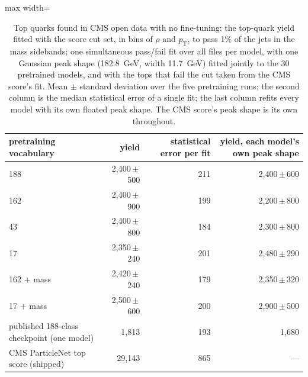 \begin{table}[t]
\centering
\small
\setlength{\tabcolsep}{4pt}
\caption{Top quarks found in CMS open data with no fine-tuning: the top-quark yield fitted with the score cut set, in bins of $\rho$ and $p_{\mathrm T}$, to pass 1\% of the jets in the mass sidebands; one simultaneous pass/fail fit over all files per model, with one Gaussian peak shape (182.8~GeV, width 11.7~GeV) fitted jointly to the 30 pretrained models, and with the tops that fail the cut taken from the CMS score's fit. Mean $\pm$ standard deviation over the five pretraining runs; the second column is the median statistical error of a single fit; the last column refits every model with its own floated peak shape. The CMS score's peak shape is its own throughout.}
\label{tab:realdata}
\begin{adjustbox}{max width=\linewidth}
\begin{tabular}{l r r r}
\toprule
pretraining vocabulary & yield & statistical error per fit & yield, each model's own peak shape \\
\midrule
188 & 2{,}400\,$\pm$\,500 & 211 & 2{,}400\,$\pm$\,600 \\
162 & 2{,}400\,$\pm$\,900 & 199 & 2{,}200\,$\pm$\,800 \\
43 & 2{,}400\,$\pm$\,800 & 184 & 2{,}300\,$\pm$\,800 \\
17 & 2{,}350\,$\pm$\,240 & 201 & 2{,}480\,$\pm$\,290 \\
162 + mass & 2{,}420\,$\pm$\,240 & 179 & 2{,}350\,$\pm$\,320 \\
17 + mass & 2{,}500\,$\pm$\,600 & 200 & 2{,}900\,$\pm$\,500 \\
\addlinespace
published 188-class checkpoint (one model) & 1{,}813 & 193 & 1{,}680 \\
CMS ParticleNet top score (shipped) & 29{,}143 & 865 & --- \\
\bottomrule
\end{tabular}
\end{adjustbox}
\end{table}
